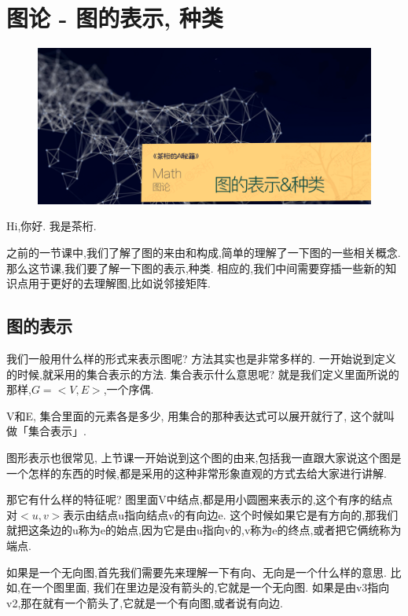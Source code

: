 \chapter{图论 - 图的表示, 种类}
\begin{figure}[ht]
  \centering
  \includegraphics[width=1\textwidth]{asset/茶桁的AI秘籍_Math_24.png}
\end{figure}

\newpage

Hi,你好. 我是茶桁. 

之前的一节课中,我们了解了图的来由和构成,简单的理解了一下图的一些相关概念. 那么这节课,我们要了解一下图的表示,种类. 相应的,我们中间需要穿插一些新的知识点用于更好的去理解图,比如说邻接矩阵. 

\section{图的表示}

我们一般用什么样的形式来表示图呢? 方法其实也是非常多样的. 一开始说到定义的时候,就采用的集合表示的方法. 集合表示什么意思呢? 就是我们定义里面所说的那样,$G = <V, E>$,一个序偶. 

V和E, 集合里面的元素各是多少, 用集合的那种表达式可以展开就行了, 这个就叫做「集合表示」. 

图形表示也很常见, 上节课一开始说到这个图的由来,包括我一直跟大家说这个图是一个怎样的东西的时候,都是采用的这种非常形象直观的方式去给大家进行讲解. 

那它有什么样的特征呢? 图里面V中结点,都是用小圆圈来表示的,这个有序的结点对$<u,v>$表示由结点u指向结点v的有向边e. 这个时候如果它是有方向的,那我们就把这条边的u称为e的始点,因为它是由u指向v的,v称为e的终点,或者把它俩统称为端点. 

如果是一个无向图,首先我们需要先来理解一下有向、无向是一个什么样的意思. 比如,在一个图里面,
我们在里边是没有箭头的,它就是一个无向图. 如果是由v3指向v2,那在就有一个箭头了,它就是一个有向图,或者说有向边. 

